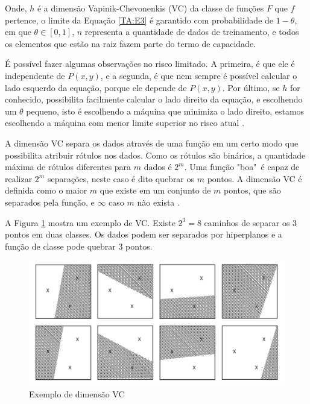 Onde, $h$ é a dimensão Vapinik-Chevonenkis (VC) da classe de funções $F$ que $f$ pertence, o limite da Equação \ref{TA:E3} é garantido com probabilidade de $1 - \theta$, em que $\theta \in [0,1]$, $n$ representa a quantidade de dados de treinamento, e todos os elementos que estão na raiz fazem parte do termo de capacidade.

É possível fazer algumas observações no risco limitado. A primeira, é que ele é independente de $P(x,y)$, e a segunda, é que nem sempre é possível calcular o lado esquerdo da equação, porque ele depende de $P(x,y)$. Por último, se $h$ for conhecido, possibilita facilmente calcular o lado direito da equação, e escolhendo um $\theta$ pequeno, isto é escolhendo a máquina que minimiza o lado direito, estamos escolhendo a máquina com menor limite superior no risco atual \cite{Burges1998Support}.

A dimensão VC separa os dados através de uma função em um certo modo que possibilita atribuir rótulos nos dados. Como os rótulos são binários, a quantidade máxima de rótulos diferentes para $m$ dados é $2^m$. Uma função "boa"\  é capaz de realizar $2^m$ separações, neste caso é dito quebrar os $m$ pontos. A dimensão VC é definida como o maior $m$ que existe em um conjunto de $m$ pontos, que são separados pela função, e $\infty$ caso $m$ não exista \cite{Scholkopf2002}.

A Figura \ref{fig:vc-dimensionexample} mostra um exemplo de VC. Existe $2^3=8$ caminhos de separar os 3 pontos em duas classes. Os dados podem ser separados por hiperplanos e a função de classe pode quebrar 3 pontos.

\begin{figure}[htb]
	\centering
	\includegraphics[scale=0.3]{./figuras/vc-dimensionexample.png}
	\caption{Exemplo de dimensão VC \cite{Scholkopf2002}}
	\label{fig:vc-dimensionexample}
\end{figure}


